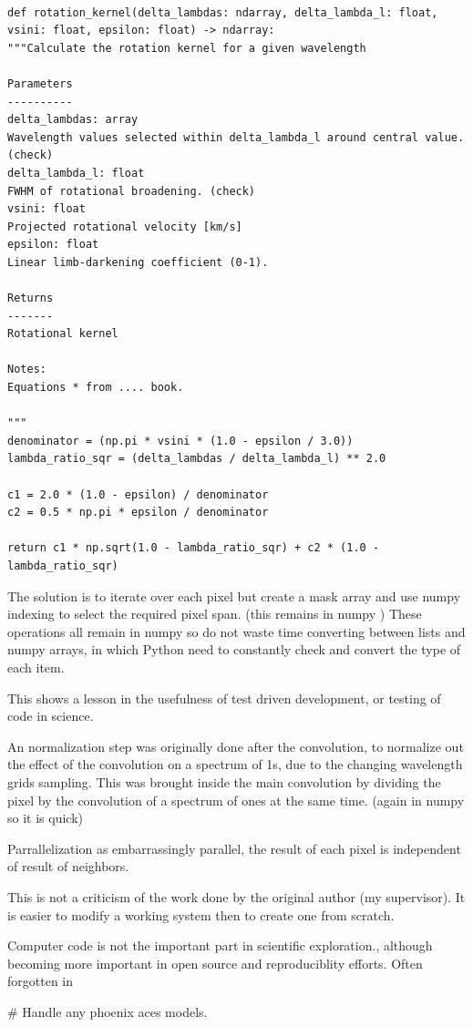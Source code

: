 \begin{lstlisting}

def rotation_kernel(delta_lambdas: ndarray, delta_lambda_l: float, vsini: float, epsilon: float) -> ndarray:
"""Calculate the rotation kernel for a given wavelength

Parameters
----------
delta_lambdas: array
Wavelength values selected within delta_lambda_l around central value. (check)
delta_lambda_l: float
FWHM of rotational broadening. (check)
vsini: float
Projected rotational velocity [km/s]
epsilon: float
Linear limb-darkening coefficient (0-1).

Returns
-------
Rotational kernel

Notes:
Equations * from .... book.

"""
denominator = (np.pi * vsini * (1.0 - epsilon / 3.0))
lambda_ratio_sqr = (delta_lambdas / delta_lambda_l) ** 2.0

c1 = 2.0 * (1.0 - epsilon) / denominator
c2 = 0.5 * np.pi * epsilon / denominator

return c1 * np.sqrt(1.0 - lambda_ratio_sqr) + c2 * (1.0 - lambda_ratio_sqr)
\end{lstlisting}

The solution is to iterate over each pixel but create a mask array and use numpy indexing to select the required pixel span. (this remains in numpy ) 
These operations all remain in numpy so do not waste time converting between lists and numpy arrays, in which Python need to constantly check and convert the type of each item.

This shows a lesson in the usefulness of test driven development, or testing of code in science.


An normalization step was originally done after the convolution, to normalize out the effect of the convolution on a spectrum of 1s, due to the changing wavelength grids sampling. This was brought inside the main convolution by dividing the pixel by the convolution of a spectrum of ones at the same time. (again in numpy so it is quick)

Parrallelization as embarrassingly parallel, the result of each pixel is independent of result of neighbors.

This is not a criticism of the work done by the original author (my supervisor). It is easier to modify a working system then to create one from scratch.

Computer code is not the important part in scientific exploration., although becoming more important in open source and reproduciblity efforts. Often forgotten in 

\# Handle any phoenix aces models.
